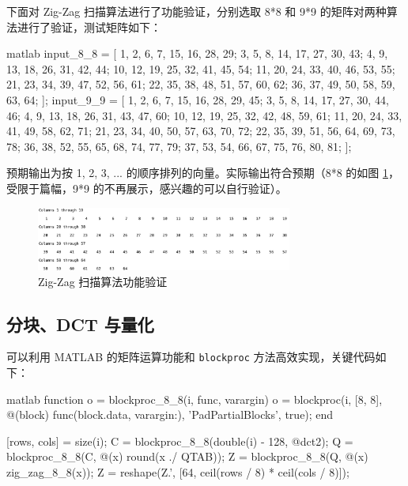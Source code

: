 \documentclass[a4paper]{article}  %
\begin{document}
下面对 Zig-Zag 扫描算法进行了功能验证，分别选取 8*8 和 9*9 的矩阵对两种算法进行了验证，测试矩阵如下：

\begin{codeblock}{matlab}
input_8_8 = [
    1,  2,  6,  7, 15, 16, 28, 29;
    3,  5,  8, 14, 17, 27, 30, 43;
    4,  9, 13, 18, 26, 31, 42, 44;
    10, 12, 19, 25, 32, 41, 45, 54;
    11, 20, 24, 33, 40, 46, 53, 55;
    21, 23, 34, 39, 47, 52, 56, 61;
    22, 35, 38, 48, 51, 57, 60, 62;
    36, 37, 49, 50, 58, 59, 63, 64;
];
input_9_9 = [
    1,  2,  6,  7, 15, 16, 28, 29, 45;
    3,  5,  8, 14, 17, 27, 30, 44, 46;
    4,  9, 13, 18, 26, 31, 43, 47, 60;
    10, 12, 19, 25, 32, 42, 48, 59, 61;
    11, 20, 24, 33, 41, 49, 58, 62, 71;
    21, 23, 34, 40, 50, 57, 63, 70, 72;
    22, 35, 39, 51, 56, 64, 69, 73, 78;
    36, 38, 52, 55, 65, 68, 74, 77, 79;
    37, 53, 54, 66, 67, 75, 76, 80, 81;
];
\end{codeblock}

预期输出为按 1, 2, 3, ... 的顺序排列的向量。实际输出符合预期（8*8 的如图 \ref{fig:2_7_zigzag88}，受限于篇幅，9*9 的不再展示，感兴趣的可以自行验证）。

\begin{figure}[ht]
    \centering
    \includegraphics[width=0.75\textwidth]{asserts/2_7_zigzag88.png}
    \caption{
        Zig-Zag 扫描算法功能验证
    }\label{fig:2_7_zigzag88}
\end{figure}

\subsection{分块、DCT 与量化}\label{sec:2_8}

可以利用 MATLAB 的矩阵运算功能和 \texttt{blockproc} 方法高效实现，关键代码如下：

\begin{codeblock}{matlab}
function o = blockproc_8_8(i, func, varargin)
    o = blockproc(i, [8, 8], @(block) func(block.data, varargin{:}), 'PadPartialBlocks', true);
end

[rows, cols] = size(i);
C = blockproc_8_8(double(i) - 128, @dct2);  %
Q = blockproc_8_8(C, @(x) round(x ./ QTAB));  %
Z = blockproc_8_8(Q, @(x) zig_zag_8_8(x));  %
Z = reshape(Z.', [64, ceil(rows / 8) * ceil(cols / 8)]);  %
\end{codeblock}
\end{document}
